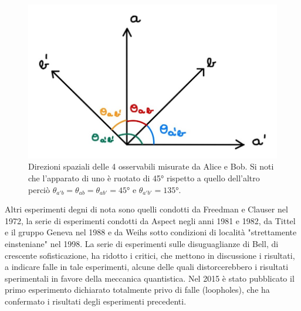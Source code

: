 \begin{figure}[!t]
    \centering
    \includegraphics[scale=0.45]{images/CHSH}
    \caption{Direzioni spaziali delle 4 osservabili misurate da Alice e Bob. Si noti che l'apparato di uno è ruotato di 45° rispetto a quello dell'altro perciò $\theta_{a'b} = \theta_{ab} = \theta_{ab'} = 45$° e $\theta_{a'b'} = 135$°.}
    \label{fig:CHSH}
\end{figure}
\noindent Altri esperimenti degni di nota sono quelli condotti da Freedman e Clauser nel 1972, la serie di esperimenti condotti da Aspect negli anni 1981 e 1982, da Tittel e il gruppo Geneva nel 1988 e da Weihs sotto condizioni di località "strettamente einsteniane" nel 1998. La serie di esperimenti sulle disuguaglianze di Bell, di crescente sofisticazione, ha ridotto i critici, che mettono in discussione i risultati, a indicare falle in tale esperimenti, alcune delle quali distorcerebbero i risultati sperimentali in favore della meccanica quantistica. Nel 2015 è stato pubblicato il primo esperimento dichiarato totalmente privo di falle (loopholes), che ha confermato i risultati degli esperimenti precedenti.